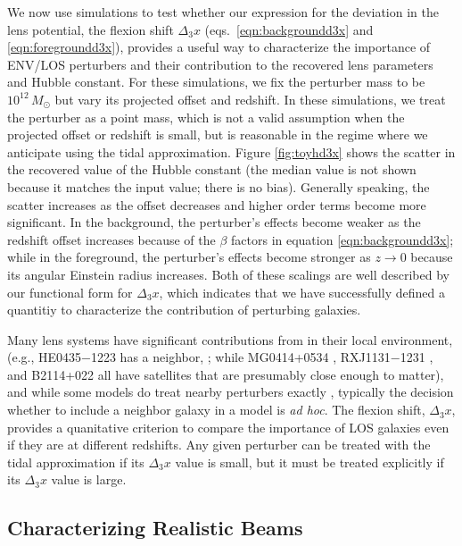 \documentclass{emulateapj}
\begin{document}
We now use simulations to test whether our expression for the deviation in the lens potential, the flexion shift $\Delta_3 x$ (eqs.\ \ref{eqn:backgroundd3x} and \ref{eqn:foregroundd3x}), provides a useful way to characterize the importance of ENV/LOS perturbers and their contribution to the recovered lens parameters and Hubble constant. For these simulations, we fix the perturber mass to be $10^{12}\,M_\odot$ but vary its projected offset and redshift. In these simulations, we treat the perturber as a point mass, which is not a valid assumption when the projected offset or redshift is small, but is reasonable in the regime where we anticipate using the tidal approximation.  Figure \ref{fig:toyhd3x} shows the scatter in the recovered value of the Hubble constant (the median value is not shown because it matches the input value; there is no bias).  Generally speaking, the scatter increases as the offset decreases and higher order terms become more significant. In the background, the perturber's effects become weaker as the redshift offset increases because of the $\beta$ factors in equation \ref{eqn:backgroundd3x}; while in the foreground, the perturber's effects become stronger as $z \to 0$ because its angular Einstein radius increases.  Both of these scalings are well described by our functional form for $\Delta_3 x$, which indicates that we have successfully defined a quantitiy to characterize the contribution of perturbing galaxies. 

Many lens systems have significant contributions from in their local environment, (e.g., HE0435$-$1223 has a neighbor, \citealt{Kochanek06}; while MG0414+0534 \citep{Tonry99}, RXJ1131$-$1231 \citep[hereafter RXJ1131][]{Sluse03}, and B2114+022 \citep{King99} all have satellites that are presumably close enough to matter), and while some models do treat nearby perturbers exactly \citep[e.g.,][]{Kochanek06, Fadely12}, typically the decision whether to include a neighbor galaxy in a model is \textit{ad hoc}. The flexion shift, $\Delta_3 x$, provides a quanitative criterion to compare the importance of LOS galaxies even if they are at different redshifts. Any given perturber can be treated with the tidal approximation if its $\Delta_3 x$ value is small, but it must be treated explicitly if its $\Delta_3 x$ value is large.

\subsection{Characterizing Realistic Beams\label{sec:Environments}}
\end{document}
